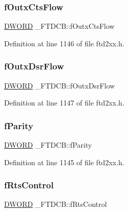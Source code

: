 \subsubsection{\texorpdfstring{f\+Outx\+Cts\+Flow}{fOutxCtsFlow}}
{\footnotesize\ttfamily \hyperlink{CatCaloProto40MHz_2inc_2WinTypes_8h_ad342ac907eb044443153a22f964bf0af}{D\+W\+O\+RD} \+\_\+\+F\+T\+D\+C\+B\+::f\+Outx\+Cts\+Flow}



Definition at line 1146 of file ftd2xx.\+h.

\mbox{\label{struct__FTDCB_af5ce76c2d358a419e028f8879aca3dcb}} 
\subsubsection{\texorpdfstring{f\+Outx\+Dsr\+Flow}{fOutxDsrFlow}}
{\footnotesize\ttfamily \hyperlink{CatCaloProto40MHz_2inc_2WinTypes_8h_ad342ac907eb044443153a22f964bf0af}{D\+W\+O\+RD} \+\_\+\+F\+T\+D\+C\+B\+::f\+Outx\+Dsr\+Flow}



Definition at line 1147 of file ftd2xx.\+h.

\mbox{\label{struct__FTDCB_a8a81323a9b1ba34bd0cc2ae97d898c73}} 
\subsubsection{\texorpdfstring{f\+Parity}{fParity}}
{\footnotesize\ttfamily \hyperlink{CatCaloProto40MHz_2inc_2WinTypes_8h_ad342ac907eb044443153a22f964bf0af}{D\+W\+O\+RD} \+\_\+\+F\+T\+D\+C\+B\+::f\+Parity}



Definition at line 1145 of file ftd2xx.\+h.

\mbox{\label{struct__FTDCB_a482e77565cf032ba8024948e3546b31b}} 
\subsubsection{\texorpdfstring{f\+Rts\+Control}{fRtsControl}}
{\footnotesize\ttfamily \hyperlink{CatCaloProto40MHz_2inc_2WinTypes_8h_ad342ac907eb044443153a22f964bf0af}{D\+W\+O\+RD} \+\_\+\+F\+T\+D\+C\+B\+::f\+Rts\+Control}



